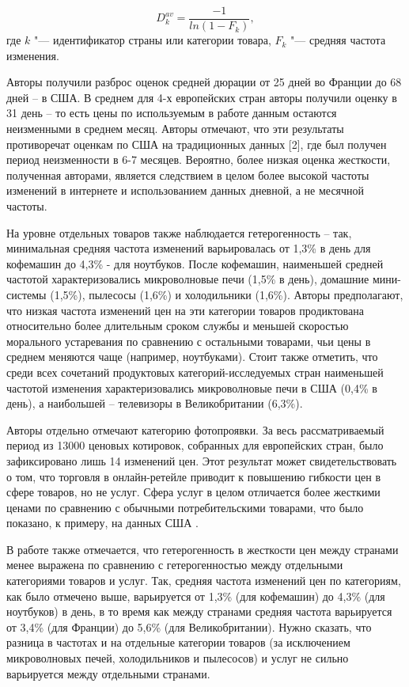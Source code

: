 \begin{equation}
	\label{eq:equation21}
	D_k^{av}=\frac{-1}{ln⁡(1-F_k)},
\end{equation}
где \( k \) "--- идентификатор страны или категории товара, \( F_k \) "--- средняя частота изменения.

Авторы получили разброс оценок средней дюрации от 25 дней во Франции до 68 дней – в США. В среднем для 4-х европейских стран авторы получили оценку в 31 день – то есть цены по используемым в работе данным остаются неизменными в среднем месяц. Авторы отмечают, что эти результаты противоречат оценкам по США на традиционных данных [2], где был получен период неизменности в 6-7 месяцев. Вероятно, более низкая оценка жесткости, полученная авторами, является следствием в целом более высокой частоты изменений в интернете и использованием данных дневной, а не месячной частоты.

На уровне отдельных товаров также наблюдается гетерогенность – так, минимальная средняя частота изменений варьировалась от 1,3\% в день для кофемашин до 4,3\% - для ноутбуков. После кофемашин, наименьшей средней частотой характеризовались микроволновые печи (1,5\% в день), домашние мини-системы (1,5\%), пылесосы (1,6\%) и холодильники (1,6\%). Авторы предполагают, что низкая частота изменений цен на эти категории товаров продиктована относительно более длительным сроком службы и меньшей скоростью морального устаревания по сравнению с остальными товарами, чьи цены в среднем меняются чаще (например, ноутбуками). Стоит также отметить, что среди всех сочетаний продуктовых категорий-исследуемых стран наименьшей частотой изменения характеризовались микроволновые печи в США (0,4\% в день), а наибольшей – телевизоры в Великобритании (6,3\%).

Авторы отдельно отмечают категорию фотопроявки. За весь рассматриваемый период из 13000 ценовых котировок, собранных для европейских стран, было зафиксировано лишь 14 изменений цен. Этот результат может свидетельствовать о том, что торговля в онлайн-ретейле приводит к повышению гибкости цен в сфере товаров, но не услуг. Сфера услуг в целом отличается более жесткими ценами по сравнению с обычными потребительскими товарами, что было показано, к примеру, на данных США \cite{bils2004some}.

В работе также отмечается, что гетерогенность в жесткости цен между странами менее выражена по сравнению с гетерогенностью между отдельными категориями товаров и услуг. Так, средняя частота изменений цен по категориям, как было отмечено выше, варьируется от 1,3\% (для кофемашин) до 4,3\% (для ноутбуков) в день, в то время как между странами средняя частота варьируется от 3,4\% (для Франции) до 5,6\% (для Великобритании). Нужно сказать, что разница в частотах и на отдельные категории товаров (за исключением микроволновых печей, холодильников и пылесосов) и услуг не сильно варьируется между отдельными странами. 

